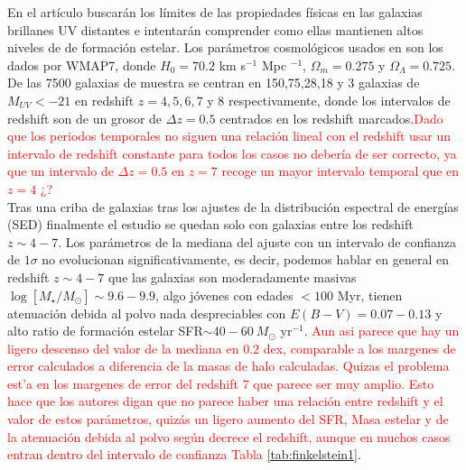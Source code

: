 \documentclass{article}
\begin{document}
En el artículo buscarán los límites de las propiedades físicas en las galaxias brillanes UV distantes e intentarán comprender como ellas mantienen altos niveles de de formación estelar. Los parámetros cosmológicos usados en \cite{finkelstein2015increasing} son los dados por WMAP7, donde $H_0=70.2$ km s$^{-1}$ Mpc $^{-1}$, $\Omega_m=0.275$ y $\Omega_\Lambda=0.725$. De las 7500 galaxias de muestra se centran en 150,75,28,18 y 3 galaxias de $M_{UV}<-21$ en redshift $z=4,5,6,7$ y 8 respectivamente, donde los intervalos de redshift son de un grosor de $\Delta z=0.5$ centrados en los redshift marcados.\textcolor{red}{Dado que los periodos temporales no siguen una relación lineal con el redshift usar un intervalo de redshift constante para todos los casos no debería de ser correcto, ya que un intervalo de $\Delta z=0.5$ en $z=7$ recoge un mayor intervalo temporal que en $z=4$ ¿?}\\

Tras una criba de galaxias tras los ajustes de la distribución espectral de energías (SED) finalmente el estudio se quedan solo con galaxias entre los redshift $z\sim 4-7$. Los parámetros de la mediana del ajuste con un intervalo de confianza de $1\sigma$ no evolucionan significativamente, es decir, podemos hablar en general en redshift $z\sim 4-7$ que las galaxias son moderadamente masivas $\log[M_\star/M_\odot]\sim 9.6-9.9$, algo jóvenes con edades $<100$ Myr, tienen atenuación debida al polvo nada despreciables con $E(B-V)=0.07-0.13$ y alto ratio de formación estelar SFR$\sim 40-60\ M_\odot$ yr$^{-1}$. \textcolor{red}{Aun asi parece que hay un ligero descenso del valor de la mediana en $0.2$ dex, comparable a los margenes de error calculados a diferencia de la masas de halo calculadas. Quizas el problema est'a en los margenes de error del redshift $7$ que parece ser muy amplio. Esto hace que los autores digan que no parece haber una relación entre redshift y el valor de estos parámetros, quizás un ligero aumento del SFR, Masa estelar y de la atenuación debida al polvo según decrece el redshift, aunque en muchos casos entran dentro del intervalo de confianza Tabla \ref{tab:finkelstein1}}.\\
\end{document}

